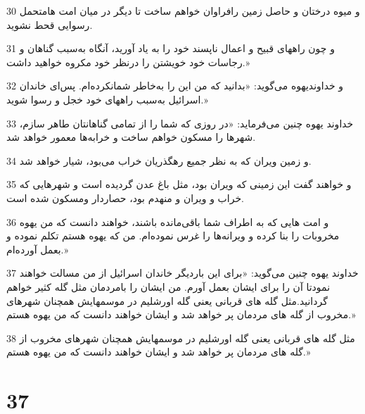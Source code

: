 \par 30 و میوه درختان و حاصل زمین رافراوان خواهم ساخت تا دیگر در میان امت هامتحمل رسوایی قحط نشوید.
\par 31 و چون راههای قبیح و اعمال ناپسند خود را به یاد آورید، آنگاه به‌سبب گناهان و رجاسات خود خویشتن را درنظر خود مکروه خواهید داشت.»
\par 32 و خداوندیهوه می‌گوید: «بدانید که من این را به‌خاطر شمانکرده‌ام. پس‌ای خاندان اسرائیل به‌سبب راههای خود خجل و رسوا شوید.»
\par 33 خداوند یهوه چنین می‌فرماید: «در روزی که شما را از تمامی گناهانتان طاهر سازم، شهرها را مسکون خواهم ساخت و خرابه‌ها معمور خواهد شد.
\par 34 و زمین ویران که به نظر جمیع رهگذریان خراب می‌بود، شیار خواهد شد.
\par 35 و خواهند گفت این زمینی که ویران بود، مثل باغ عدن گردیده است و شهرهایی که خراب و ویران و منهدم بود، حصاردار ومسکون شده است.
\par 36 و امت هایی که به اطراف شما باقی‌مانده باشند، خواهند دانست که من یهوه مخروبات را بنا کرده و ویرانه‌ها را غرس نموده‌ام. من که یهوه هستم تکلم نموده و بعمل آورده‌ام.»
\par 37 خداوند یهوه چنین می‌گوید: «برای این باردیگر خاندان اسرائیل از من مسالت خواهند نمودتا آن را برای ایشان بعمل آورم. من ایشان را بامردمان مثل گله کثیر خواهم گردانید.مثل گله های قربانی یعنی گله اورشلیم در موسمهایش همچنان شهرهای مخروب از گله های مردمان پر خواهد شد و ایشان خواهند دانست که من یهوه هستم.»
\par 38 مثل گله های قربانی یعنی گله اورشلیم در موسمهایش همچنان شهرهای مخروب از گله های مردمان پر خواهد شد و ایشان خواهند دانست که من یهوه هستم.»

\chapter{37}

